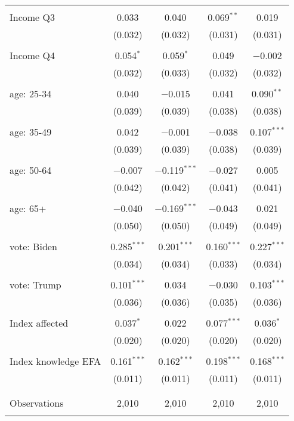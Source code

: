 \begin{tabular}{@{\extracolsep{5pt}}lcccc}
  & & & & \\ 
 Income Q3 & 0.033 & 0.040 & 0.069$^{**}$ & 0.019 \\ 
  & (0.032) & (0.032) & (0.031) & (0.031) \\ 
  & & & & \\ 
 Income Q4 & 0.054$^{*}$ & 0.059$^{*}$ & 0.049 & $-$0.002 \\ 
  & (0.032) & (0.033) & (0.032) & (0.032) \\ 
  & & & & \\ 
 age: 25-34 & 0.040 & $-$0.015 & 0.041 & 0.090$^{**}$ \\ 
  & (0.039) & (0.039) & (0.038) & (0.038) \\ 
  & & & & \\ 
 age: 35-49 & 0.042 & $-$0.001 & $-$0.038 & 0.107$^{***}$ \\ 
  & (0.039) & (0.039) & (0.038) & (0.039) \\ 
  & & & & \\ 
 age: 50-64 & $-$0.007 & $-$0.119$^{***}$ & $-$0.027 & 0.005 \\ 
  & (0.042) & (0.042) & (0.041) & (0.041) \\ 
  & & & & \\ 
 age: 65+ & $-$0.040 & $-$0.169$^{***}$ & $-$0.043 & 0.021 \\ 
  & (0.050) & (0.050) & (0.049) & (0.049) \\ 
  & & & & \\ 
 vote: Biden & 0.285$^{***}$ & 0.201$^{***}$ & 0.160$^{***}$ & 0.227$^{***}$ \\ 
  & (0.034) & (0.034) & (0.033) & (0.034) \\ 
  & & & & \\ 
 vote: Trump & 0.101$^{***}$ & 0.034 & $-$0.030 & 0.103$^{***}$ \\ 
  & (0.036) & (0.036) & (0.035) & (0.036) \\ 
  & & & & \\ 
 Index affected & 0.037$^{*}$ & 0.022 & 0.077$^{***}$ & 0.036$^{*}$ \\ 
  & (0.020) & (0.020) & (0.020) & (0.020) \\ 
  & & & & \\ 
 Index knowledge EFA & 0.161$^{***}$ & 0.162$^{***}$ & 0.198$^{***}$ & 0.168$^{***}$ \\ 
  & (0.011) & (0.011) & (0.011) & (0.011) \\ 
  & & & & \\ 
\hline \\[-1.8ex] 

Observations & 2,010 & 2,010 & 2,010 & 2,010 \\ 
\hline 
\hline \\[-1.8ex] 
\end{tabular} 